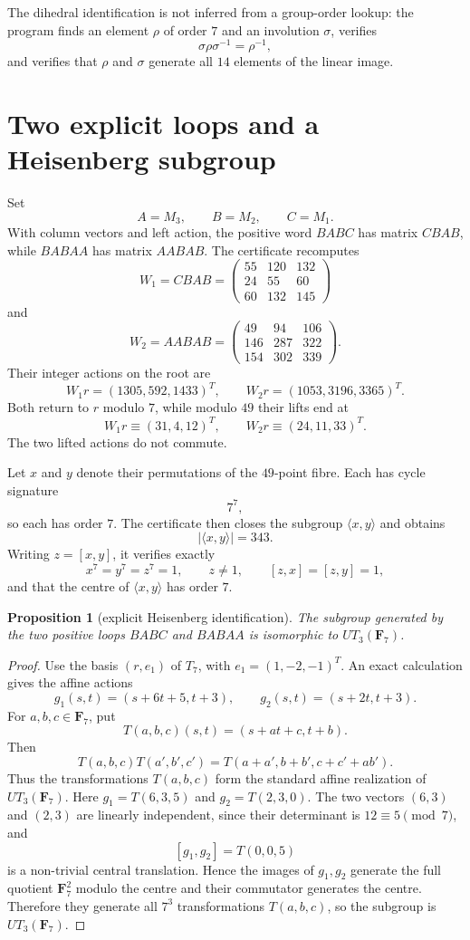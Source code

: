 \documentclass[11pt]{article}
\newtheorem{proposition}{Proposition}
\newcommand{\Fseven}{\mathbf F_7}
\begin{document}
The dihedral identification is not inferred from a group-order lookup: the program finds an element $\rho$ of order $7$ and an involution $\sigma$, verifies
\[
\sigma\rho\sigma^{-1}=\rho^{-1},
\]
and verifies that $\rho$ and $\sigma$ generate all $14$ elements of the linear image.

\section{Two explicit loops and a Heisenberg subgroup}
Set
\[
A=M_3,\qquad B=M_2,\qquad C=M_1.
\]
With column vectors and left action, the positive word $BABC$ has matrix $CBAB$, while $BABAA$ has matrix $AABAB$.  The certificate recomputes
\[
W_1=CBAB=
\begin{pmatrix}
55&120&132\\
24&55&60\\
60&132&145
\end{pmatrix}
\]
and
\[
W_2=AABAB=
\begin{pmatrix}
49&94&106\\
146&287&322\\
154&302&339
\end{pmatrix}.
\]
Their integer actions on the root are
\[
W_1r=(1305,592,1433)^T,
\qquad
W_2r=(1053,3196,3365)^T.
\]
Both return to $r$ modulo $7$, while modulo $49$ their lifts end at
\[
W_1r\equiv(31,4,12)^T,
\qquad
W_2r\equiv(24,11,33)^T.
\]
The two lifted actions do not commute.

Let $x$ and $y$ denote their permutations of the $49$-point fibre.  Each has cycle signature
\[
7^7,
\]
so each has order $7$.  The certificate then closes the subgroup $\langle x,y\rangle$ and obtains
\[
|\langle x,y\rangle|=343.
\]
Writing $z=[x,y]$, it verifies exactly
\[
x^7=y^7=z^7=1,
\qquad
z\ne1,
\qquad
[z,x]=[z,y]=1,
\]
and that the centre of $\langle x,y\rangle$ has order $7$.

\begin{proposition}[explicit Heisenberg identification]
The subgroup generated by the two positive loops $BABC$ and $BABAA$ is isomorphic to $UT_3(\Fseven)$.
\end{proposition}

\begin{proof}
Use the basis $(r,e_1)$ of $T_7$, with $e_1=(1,-2,-1)^T$. An exact calculation gives the affine actions
\[
g_1(s,t)=(s+6t+5,t+3),\qquad g_2(s,t)=(s+2t,t+3).
\]
For $a,b,c\in\Fseven$, put
\[
T(a,b,c)(s,t)=(s+at+c,t+b).
\]
Then
\[
T(a,b,c)T(a',b',c')=T(a+a',b+b',c+c'+ab').
\]
Thus the transformations $T(a,b,c)$ form the standard affine realization of $UT_3(\Fseven)$. Here $g_1=T(6,3,5)$ and $g_2=T(2,3,0)$. The two vectors $(6,3)$ and $(2,3)$ are linearly independent, since their determinant is $12\equiv5\pmod7$, and
\[
[g_1,g_2]=T(0,0,5)
\]
is a non-trivial central translation. Hence the images of $g_1,g_2$ generate the full quotient $\Fseven^2$ modulo the centre and their commutator generates the centre. Therefore they generate all $7^3$ transformations $T(a,b,c)$, so the subgroup is $UT_3(\Fseven)$.
\end{proof}
\end{document}
